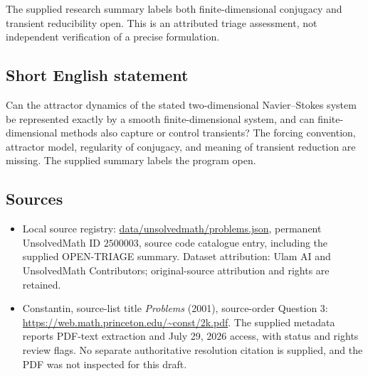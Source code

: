 \documentclass[11pt]{article}
\begin{document}
The supplied research summary labels both finite-dimensional conjugacy and transient reducibility open. This is an attributed triage assessment, not independent verification of a precise formulation.
\subsection{Short English statement}
Can the attractor dynamics of the stated two-dimensional Navier--Stokes system be represented exactly by a smooth finite-dimensional system, and can finite-dimensional methods also capture or control transients? The forcing convention, attractor model, regularity of conjugacy, and meaning of transient reduction are missing. The supplied summary labels the program open.
\subsection{Sources}
\begin{itemize}
\item Local source registry: \url{data/unsolvedmath/problems.json}, permanent UnsolvedMath ID $2500003$, source code catalogue entry, including the supplied OPEN-TRIAGE summary. Dataset attribution: Ulam AI and UnsolvedMath Contributors; original-source attribution and rights are retained.
\item Constantin, source-list title \emph{Problems} (2001), source-order Question 3: \url{https://web.math.princeton.edu/~const/2k.pdf}. The supplied metadata reports PDF-text extraction and July 29, 2026 access, with status and rights review flags. No separate authoritative resolution citation is supplied, and the PDF was not inspected for this draft.
\end{itemize}
\end{document}
